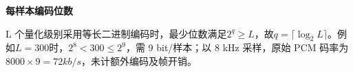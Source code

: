 {\color{ink}\bfseries 每样本编码位数}\par\vspace{1bp}L 个量化级别采用等长二进制编码时，最少位数满足\(2^{q}\ge L\)，故\(q=\allowbreak{}\lceil \operatorname{log}_{2}L\rceil \)。例如\(L=\allowbreak{}300\)时，\(2^{8}<\allowbreak{}300\le 2^{9}\)，需 9 bit/\allowbreak{}样本；以 8 kHz 采样，原始 PCM 码率为\(8000\times 9=\allowbreak{}72 kb/\allowbreak{}s\)，未计额外编码及帧开销。
